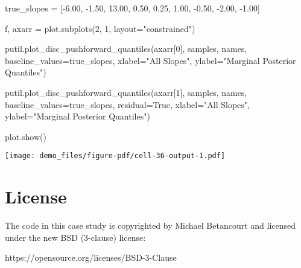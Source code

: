\documentclass[
  letterpaper,
  DIV=11,
  numbers=noendperiod]{scrartcl}
\newenvironment{Shaded}{\begin{snugshade}}{\end{snugshade}}
\newcommand{\DecValTok}[1]{\textcolor[rgb]{0.68,0.00,0.00}{#1}}
\newcommand{\FloatTok}[1]{\textcolor[rgb]{0.68,0.00,0.00}{#1}}
\newcommand{\NormalTok}[1]{\textcolor[rgb]{0.00,0.23,0.31}{#1}}
\newcommand{\OperatorTok}[1]{\textcolor[rgb]{0.37,0.37,0.37}{#1}}
\newcommand{\StringTok}[1]{\textcolor[rgb]{0.13,0.47,0.30}{#1}}
\newcommand{\VariableTok}[1]{\textcolor[rgb]{0.07,0.07,0.07}{#1}}
\begin{document}
\begin{Shaded}
\begin{Highlighting}[]
\NormalTok{true\_slopes }\OperatorTok{=}\NormalTok{ [}\OperatorTok{{-}}\FloatTok{6.00}\NormalTok{, }\OperatorTok{{-}}\FloatTok{1.50}\NormalTok{, }\FloatTok{13.00}\NormalTok{,  }\FloatTok{0.50}\NormalTok{, }\FloatTok{0.25}\NormalTok{,}
               \FloatTok{1.00}\NormalTok{, }\OperatorTok{{-}}\FloatTok{0.50}\NormalTok{, }\OperatorTok{{-}}\FloatTok{2.00}\NormalTok{, }\OperatorTok{{-}}\FloatTok{1.00}\NormalTok{]}

\NormalTok{f, axarr }\OperatorTok{=}\NormalTok{ plot.subplots(}\DecValTok{2}\NormalTok{, }\DecValTok{1}\NormalTok{, layout}\OperatorTok{=}\StringTok{"constrained"}\NormalTok{)}

\NormalTok{putil.plot\_disc\_pushforward\_quantiles(axarr[}\DecValTok{0}\NormalTok{], samples, names,}
\NormalTok{                                        baseline\_values}\OperatorTok{=}\NormalTok{true\_slopes,}
\NormalTok{                                      xlabel}\OperatorTok{=}\StringTok{"All Slopes"}\NormalTok{,}
\NormalTok{                                      ylabel}\OperatorTok{=}\StringTok{"Marginal Posterior Quantiles"}\NormalTok{)}

\NormalTok{putil.plot\_disc\_pushforward\_quantiles(axarr[}\DecValTok{1}\NormalTok{], samples, names,}
\NormalTok{                                      baseline\_values}\OperatorTok{=}\NormalTok{true\_slopes,}
\NormalTok{                                      residual}\OperatorTok{=}\VariableTok{True}\NormalTok{,}
\NormalTok{                                      xlabel}\OperatorTok{=}\StringTok{"All Slopes"}\NormalTok{,}
\NormalTok{                                      ylabel}\OperatorTok{=}\StringTok{"Marginal Posterior Quantiles"}\NormalTok{)}

\NormalTok{plot.show()}
\end{Highlighting}
\end{Shaded}

\texttt{[image: demo\_files/figure-pdf/cell-36-output-1.pdf]}

\section*{License}\label{license}

The code in this case study is copyrighted by Michael Betancourt and
licensed under the new BSD (3-clause) license:

https://opensource.org/licenses/BSD-3-Clause
\end{document}
